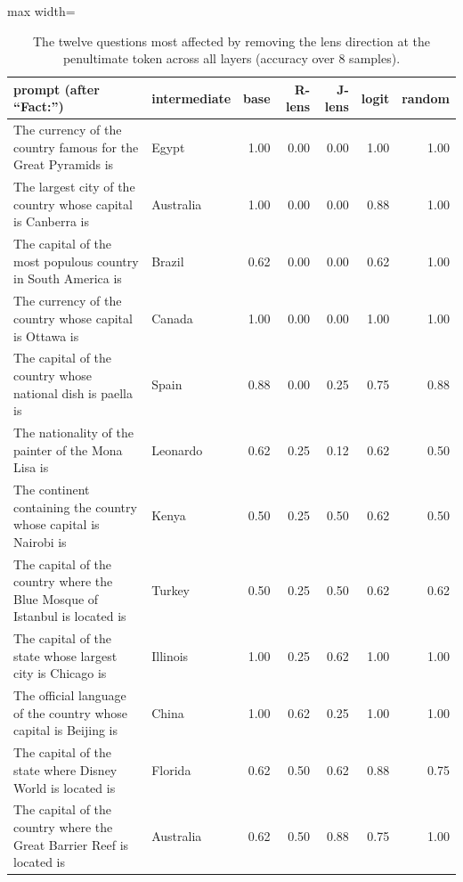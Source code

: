 \begin{table}[t]
\centering
\footnotesize
\caption{The twelve questions most affected by removing the lens direction at the penultimate token across all layers (accuracy over 8 samples).}
\label{tab:rlens_examples}
\begin{adjustbox}{max width=\textwidth}
\begin{tabular}{p{7.2cm}lrrrrr}
\toprule
prompt (after ``Fact:'') & intermediate & base & R-lens & J-lens & logit & random \\
\midrule
The currency of the country famous for the Great Pyramids is & Egypt & 1.00 & 0.00 & 0.00 & 1.00 & 1.00 \\
The largest city of the country whose capital is Canberra is & Australia & 1.00 & 0.00 & 0.00 & 0.88 & 1.00 \\
The capital of the most populous country in South America is & Brazil & 0.62 & 0.00 & 0.00 & 0.62 & 1.00 \\
The currency of the country whose capital is Ottawa is & Canada & 1.00 & 0.00 & 0.00 & 1.00 & 1.00 \\
The capital of the country whose national dish is paella is & Spain & 0.88 & 0.00 & 0.25 & 0.75 & 0.88 \\
The nationality of the painter of the Mona Lisa is & Leonardo & 0.62 & 0.25 & 0.12 & 0.62 & 0.50 \\
The continent containing the country whose capital is Nairobi is & Kenya & 0.50 & 0.25 & 0.50 & 0.62 & 0.50 \\
The capital of the country where the Blue Mosque of Istanbul is located is & Turkey & 0.50 & 0.25 & 0.50 & 0.62 & 0.62 \\
The capital of the state whose largest city is Chicago is & Illinois & 1.00 & 0.25 & 0.62 & 1.00 & 1.00 \\
The official language of the country whose capital is Beijing is & China & 1.00 & 0.62 & 0.25 & 1.00 & 1.00 \\
The capital of the state where Disney World is located is & Florida & 0.62 & 0.50 & 0.62 & 0.88 & 0.75 \\
The capital of the country where the Great Barrier Reef is located is & Australia & 0.62 & 0.50 & 0.88 & 0.75 & 1.00 \\
\bottomrule
\end{tabular}
\end{adjustbox}
\end{table}